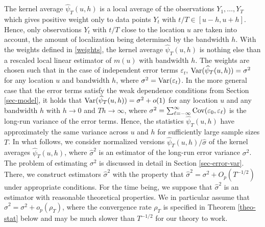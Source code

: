 The kernel average $\widehat{\psi}_T(u,h)$ is a local average of the observations $Y_1,\ldots,Y_T$ which gives positive weight only to data points $Y_t$ with $t/T \in [u-h,u+h]$. Hence, only observations $Y_t$ with $t/T$ close to the location $u$ are taken into account, the amount of localization being determined by the bandwidth $h$. With the weights defined in \eqref{weights}, the kernel average $\widehat{\psi}_T(u,h)$ is nothing else than a rescaled local linear estimator of $m(u)$ with bandwidth $h$. The weights are chosen such that in the case of independent error terms $\varepsilon_t$, $\textnormal{Var}(\widehat{\psi}_T(u,h)) = \sigma^2$ for any location $u$ and bandwidth $h$, where $\sigma^2 = \textnormal{Var}(\varepsilon_t)$. In the more general case that the error terms satisfy the weak dependence conditions from Section \ref{sec-model}, it holds that $\textnormal{Var}(\widehat{\psi}_T(u,h)) = \sigma^2 + o(1)$ for any location $u$ and any bandwidth $h$ with $h \rightarrow 0$ and $Th \rightarrow \infty$, where $\sigma^2 = \sum\nolimits_{\ell=-\infty}^{\infty} \textnormal{Cov}(\varepsilon_0, \varepsilon_{\ell})$ is the long-run variance of the error terms. Hence, the statistics $\widehat{\psi}_T(u,h)$ have approximately the same variance across $u$ and $h$ for sufficiently large sample sizes $T$. In what follows, we consider normalized versions $\widehat{\psi}_T(u,h)/\widehat{\sigma}$ of the kernel averages $\widehat{\psi}_T(u,h)$, where $\widehat{\sigma}^2$ is an estimator of the long-run error variance $\sigma^2$. The problem of estimating $\sigma^2$ is discussed in detail in Section \ref{sec-error-var}. There, we construct estimators $\widehat{\sigma}^2$ with the property that $\widehat{\sigma}^2 = \sigma^2 + O_p(T^{-1/2})$ under appropriate conditions. For the time being, we suppose that $\widehat{\sigma}^2$ is an estimator with reasonable theoretical properties. We in particular assume that $\widehat{\sigma}^2 = \sigma^2 + o_p(\rho_T)$, where the convergence rate $\rho_T$ is specified in Theorem \ref{theo-stat} below and may be much slower than $T^{-1/2}$ for our theory to work.  


